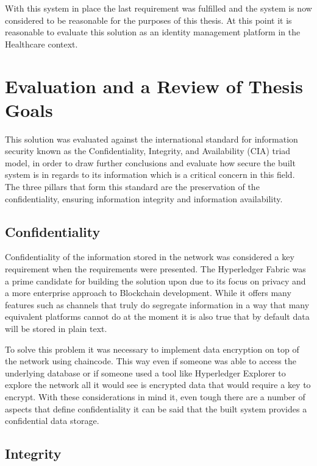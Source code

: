 With this system in place the last requirement was fulfilled and the system is
now considered to be reasonable for the purposes of this thesis. At this point
it is reasonable to evaluate this solution as an identity management platform
in the Healthcare context.

\section{Evaluation and a Review of Thesis Goals}

This solution was evaluated against the international standard for information
security known as the Confidentiality, Integrity, and Availability (CIA) triad
model, in order to draw further conclusions and evaluate how secure the built
system is in regards to its information which is a critical concern in this
field. The three pillars that form this standard are the preservation of the
confidentiality, ensuring information integrity and information availability.

\subsection{Confidentiality}

Confidentiality of the information stored in the network was considered a key
requirement when the requirements were presented. The Hyperledger Fabric was a
prime candidate for building the solution upon due to its focus on privacy and
a more enterprise approach to Blockchain development. While it offers many
features such as channels that truly do segregate information in a way that
many equivalent platforms cannot do at the moment it is also true that by
default data will be stored in plain text. 

To solve this problem it was necessary to implement data encryption on top of
the network using chaincode. This way even if someone was able to access the
underlying database or if someone used a tool like Hyperledger Explorer to
explore the network all it would see is encrypted data that would require a key
to encrypt. With these considerations in mind it, even tough there are a number
of aspects that define confidentiality it can be said that the built system
provides a confidential data storage.

\subsection{Integrity}

